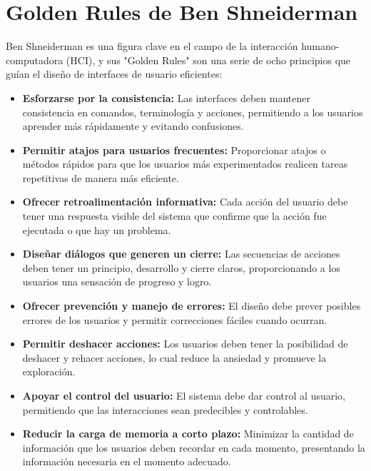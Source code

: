 \documentclass[10pt]{osa-supplemental-document}
\begin{document}
\section{Golden Rules de Ben Shneiderman}
Ben Shneiderman es una figura clave en el campo de la interacción humano-computadora (HCI), y sus "Golden Rules" son una serie de ocho principios que guían el diseño de interfaces de usuario eficientes:
\begin{itemize}
    \item \textbf{Esforzarse por la consistencia:} Las interfaces deben mantener consistencia en comandos, terminología y acciones, permitiendo a los usuarios aprender más rápidamente y evitando confusiones.
    \item \textbf{Permitir atajos para usuarios frecuentes:} Proporcionar atajos o métodos rápidos para que los usuarios más experimentados realicen tareas repetitivas de manera más eficiente.
    \item \textbf{Ofrecer retroalimentación informativa:} Cada acción del usuario debe tener una respuesta visible del sistema que confirme que la acción fue ejecutada o que hay un problema.
    \item \textbf{Diseñar diálogos que generen un cierre:} Las secuencias de acciones deben tener un principio, desarrollo y cierre claros, proporcionando a los usuarios una sensación de progreso y logro.
    \item \textbf{Ofrecer prevención y manejo de errores:} El diseño debe prever posibles errores de los usuarios y permitir correcciones fáciles cuando ocurran.
    \item \textbf{Permitir deshacer acciones:} Los usuarios deben tener la posibilidad de deshacer y rehacer acciones, lo cual reduce la ansiedad y promueve la exploración.
    \item \textbf{Apoyar el control del usuario:} El sistema debe dar control al usuario, permitiendo que las interacciones sean predecibles y controlables.
    \item \textbf{Reducir la carga de memoria a corto plazo:} Minimizar la cantidad de información que los usuarios deben recordar en cada momento, presentando la información necesaria en el momento adecuado.
\end{itemize}
\end{document}
